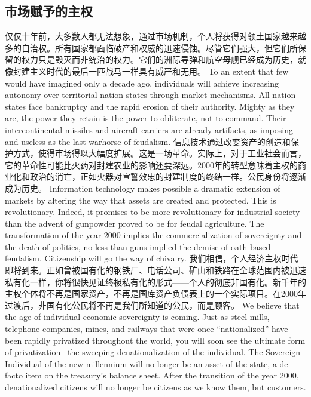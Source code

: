 \subsection{市场赋予的主权}
\begin{paracol}{2}[]
仅仅十年前，大多数人都无法想象，通过市场机制，个人将获得对领土国家越来越多的自治权。所有国家都面临破产和权威的迅速侵蚀。尽管它们强大，但它们所保留的权力只是毁灭而非统治的权力。它们的洲际导弹和航空母舰已经成为历史，就像封建主义时代的最后一匹战马一样具有威严和无用。
\switchcolumn
To an extent that few would have imagined only a decade ago, individuals will achieve increasing autonomy over territorial nation-states through market mechanisms. All nation-states face bankruptcy and the rapid erosion of their authority. Mighty as they are, the power they retain is the power to obliterate, not to command. Their intercontinental missiles and aircraft carriers are already artifacts, as imposing and useless as the last warhorse of feudalism.
\switchcolumn*
信息技术通过改变资产的创造和保护方式，使得市场得以大幅度扩展。这是一场革命。实际上，对于工业社会而言，它的革命性可能比火药对封建农业的影响还要深远。2000年的转型意味着主权的商业化和政治的消亡，正如火器对宣誓效忠的封建制度的终结一样。公民身份将逐渐成为历史。
\switchcolumn
Information technology makes possible a dramatic extension of markets by altering the way that assets are created and protected. This is revolutionary. Indeed, it promises to be more revolutionary for industrial society than the advent of gunpowder proved to be for feudal agriculture. The transformation of the year 2000 implies the commercialization of sovereignty and the death of politics, no less than guns implied the demise of oath-based feudalism. Citizenship will go the way of chivalry.
\switchcolumn*
我们相信，个人经济主权时代即将到来。正如曾被国有化的钢铁厂、电话公司、矿山和铁路在全球范围内被迅速私有化一样，你将很快见证终极私有化的形式——个人的彻底非国有化。新千年的主权个体将不再是国家资产，不再是国库资产负债表上的一个实际项目。在2000年过渡后，非国有化公民将不再是我们所知道的公民，而是顾客。
\switchcolumn
We believe that the age of individual economic sovereignty is coming. Just as steel mills, telephone companies, mines, and railways that were once ``nationalized'' have been rapidly privatized throughout the world, you will soon see the ultimate form of privatization --the sweeping denationalization of the individual. The Sovereign Individual of the new millennium will no longer be an asset of the state, a de facto item on the treasury's balance sheet. After the transition of the year 2000, denationalized citizens will no longer be citizens as we know them, but customers.
\end{paracol}

